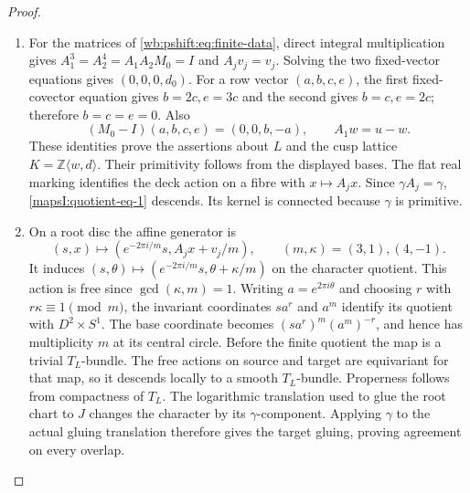 \begin{proof}
\begin{enumerate}[label=\arabic*.,leftmargin=*]
\item For the matrices of \eqref{wb:pshift:eq:finite-data}, direct integral
multiplication gives
$A_1^3=A_2^4=A_1A_2M_0=I$ and $A_jv_j=v_j$.
Solving the two fixed-vector equations gives $(0,0,0,d_0)$.
For a row vector $(a,b,c,e)$, the first fixed-covector equation
gives $b=2c,e=3c$ and the second gives $b=c,e=2c$;
therefore $b=c=e=0$.  Also
\[
 (M_0-I)(a,b,c,e)=(0,0,b,-a),\qquad
 A_1w=u-w.
\]
These identities prove the assertions about $L$ and the cusp
lattice $K=\mathbb Z\langle w,d\rangle$.  Their primitivity follows
from the displayed bases.  The flat real marking identifies the
deck action on a fibre with $x\mapsto A_jx$.  Since
$\gamma A_j=\gamma$, \eqref{mapsI:quotient-eq-1} descends.  Its kernel is connected
because $\gamma$ is primitive.

\item On a root disc the affine generator is
\[
 (s,x)\longmapsto
 (e^{-2\pi i/m}s,A_jx+v_j/m),\qquad (m,\kappa)=(3,1),(4,-1).
\]
It induces $(s,\theta)\mapsto
(e^{-2\pi i/m}s,\theta+\kappa/m)$ on the character quotient.
This action is free since $\gcd(\kappa,m)=1$.  Writing
$a=e^{2\pi i\theta}$ and choosing $r$ with $r\kappa\equiv1\pmod m$,
the invariant coordinates $s a^r$ and $a^m$ identify its quotient
with $D^2\times S^1$.  The base coordinate becomes
$(s a^r)^m(a^m)^{-r}$, and hence has multiplicity $m$ at its
central circle.  Before the finite quotient the map is a trivial
$T_L$-bundle.  The free actions on source and target are
equivariant for that map, so it descends locally to a smooth
$T_L$-bundle.  Properness follows from compactness of $T_L$.
The logarithmic translation used to glue the root chart to $J$
changes the character by its $\gamma$-component.  Applying
$\gamma$ to the actual gluing translation therefore gives the
target gluing, proving agreement on every overlap.
\end{enumerate}
\end{proof}